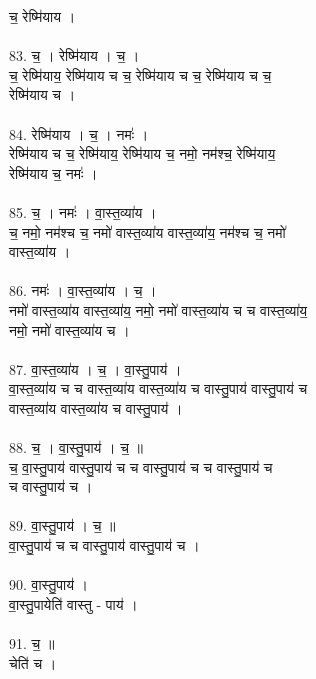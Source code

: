 च॒ रेष्मि॑याय ।\\
\\
83. च॒ । रेष्मि॑याय । च॒ ।\\
च॒ रेष्मि॑याय॒ रेष्मि॑याय च च॒ रेष्मि॑याय च च॒ रेष्मि॑याय च च॒\\
रेष्मि॑याय च ।\\
\\
84. रेष्मि॑याय । च॒ । नमः॑ ।\\
रेष्मि॑याय च च॒ रेष्मि॑याय॒ रेष्मि॑याय च॒ नमो॒ नम॑श्च॒ रेष्मि॑याय॒\\
रेष्मि॑याय च॒ नमः॑ ।\\
\\
85. च॒ । नमः॑ । वा॒स्त॒व्या॑य ।\\
च॒ नमो॒ नम॑श्च च॒ नमो॑ वास्त॒व्या॑य वास्त॒व्या॑य॒ नम॑श्च च॒ नमो॑\\
वास्त॒व्या॑य ।\\
\\
86. नमः॑ । वा॒स्त॒व्या॑य । च॒ ।\\
नमो॑ वास्त॒व्या॑य वास्त॒व्या॑य॒ नमो॒ नमो॑ वास्त॒व्या॑य च च वास्त॒व्या॑य॒\\
नमो॒ नमो॑ वास्त॒व्या॑य च ।\\
\\
87. वा॒स्त॒व्या॑य । च॒ । वा॒स्तु॒पाय॑ ।\\
वा॒स्त॒व्या॑य च च वास्त॒व्या॑य वास्त॒व्या॑य च वास्तु॒पाय॑ वास्तु॒पाय॑ च\\
वास्त॒व्या॑य वास्त॒व्या॑य च वास्तु॒पाय॑ ।\\
\\
88. च॒ । वा॒स्तु॒पाय॑ । च॒ ॥\\
च॒ वा॒स्तु॒पाय॑ वास्तु॒पाय॑ च च वास्तु॒पाय॑ च च वास्तु॒पाय॑ च\\
च वास्तु॒पाय॑ च ।\\
\\
89. वा॒स्तु॒पाय॑ । च॒ ॥\\
वा॒स्तु॒पाय॑ च च वास्तु॒पाय॑ वास्तु॒पाय॑ च ।\\
\\
90. वा॒स्तु॒पाय॑ ।\\
वा॒स्तु॒पायेति॑ वास्तु - पाय॑ ।\\
\\
91. च॒ ॥\\
चेति॑ च ।\\
